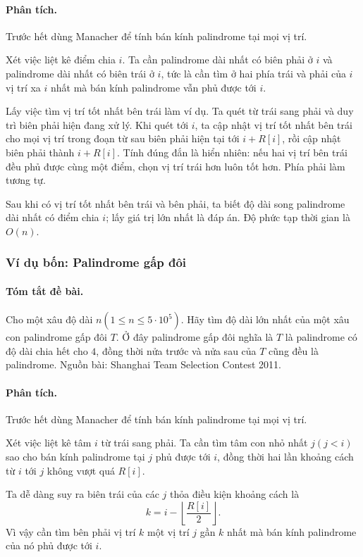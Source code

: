 \documentclass[11pt]{article}
\begin{document}
\paragraph{Phân tích.}
Trước hết dùng Manacher để tính bán kính palindrome tại mọi vị trí.

Xét việc liệt kê điểm chia \(i\). Ta cần palindrome dài nhất có biên phải ở
\(i\) và palindrome dài nhất có biên trái ở \(i\), tức là cần tìm ở hai phía
trái và phải của \(i\) vị trí xa \(i\) nhất mà bán kính palindrome vẫn phủ được
tới \(i\).

Lấy việc tìm vị trí tốt nhất bên trái làm ví dụ. Ta quét từ trái sang phải và
duy trì biên phải hiện đang xử lý. Khi quét tới \(i\), ta cập nhật vị trí tốt
nhất bên trái cho mọi vị trí trong đoạn từ sau biên phải hiện tại tới
\(i+R[i]\), rồi cập nhật biên phải thành \(i+R[i]\). Tính đúng đắn là hiển
nhiên: nếu hai vị trí bên trái đều phủ được cùng một điểm, chọn vị trí trái hơn
luôn tốt hơn. Phía phải làm tương tự.

Sau khi có vị trí tốt nhất bên trái và bên phải, ta biết độ dài song palindrome
dài nhất có điểm chia \(i\); lấy giá trị lớn nhất là đáp án. Độ phức tạp thời
gian là \(O(n)\).

\subsubsection{Ví dụ bốn: Palindrome gấp đôi}

\paragraph{Tóm tắt đề bài.}
Cho một xâu độ dài \(n(1\le n\le5\cdot10^5)\). Hãy tìm độ dài lớn nhất của một
xâu con palindrome gấp đôi \(T\). Ở đây palindrome gấp đôi nghĩa là \(T\) là
palindrome có độ dài chia hết cho \(4\), đồng thời nửa trước và nửa sau của
\(T\) cũng đều là palindrome. Nguồn bài: Shanghai Team Selection Contest 2011.

\paragraph{Phân tích.}
Trước hết dùng Manacher để tính bán kính palindrome tại mọi vị trí.

Xét việc liệt kê tâm \(i\) từ trái sang phải. Ta cần tìm tâm con nhỏ nhất
\(j(j<i)\) sao cho bán kính palindrome tại \(j\) phủ được tới \(i\), đồng thời
hai lần khoảng cách từ \(i\) tới \(j\) không vượt quá \(R[i]\).

Ta dễ dàng suy ra biên trái của các \(j\) thỏa điều kiện khoảng cách là
\[
  k=i-\left\lfloor\frac{R[i]}{2}\right\rfloor.
\]
Vì vậy cần tìm bên phải vị trí \(k\) một vị trí \(j\) gần \(k\) nhất mà bán kính
palindrome của nó phủ được tới \(i\).
\end{document}
